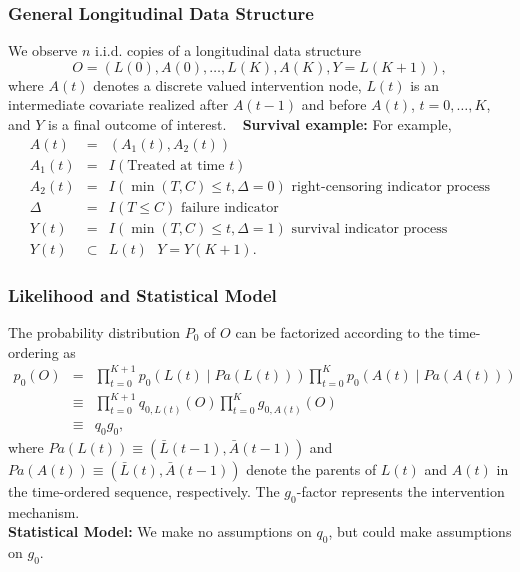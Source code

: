 \documentclass[t]{beamer}
\begin{document}
\begin{frame}
\frametitle{General Longitudinal Data Structure}
We observe $n$ i.i.d. copies of a longitudinal data structure
\[
O=(L(0),A(0),\ldots,L(K),A(K),Y=L(K+1)),\]
where $A(t)$ denotes a discrete valued intervention node,  $L(t)$ is an intermediate covariate realized after 
$A(t-1)$ and  before $A(t)$, $t=0,\ldots,K$, and $Y$ is a final outcome of interest.
\ \newline
{\bf Survival example:}
For example, 
\begin{eqnarray*}
A(t)&=&(A_1(t),A_2(t))\\
A_1(t)&=& I(\mbox{Treated at time $t$})\\
A_2(t)&=& I(\min(T,C)\leq t,\Delta=0)\mbox{ right-censoring indicator process}\\
\Delta&=&I(T\leq C)\mbox{ failure indicator}\\
Y(t)&=&I(\min(T,C)\leq t,\Delta=1)\mbox{ survival indicator process}\\
Y(t)&\subset& L(t)\mbox{ $Y=Y(K+1)$}.
\end{eqnarray*}
\end{frame}

\begin{frame}
\frametitle{Likelihood and Statistical Model}
The probability distribution $P_0$ of $O$ can be factorized according to the time-ordering as 
\begin{eqnarray*}
p_0(O)&=&\prod_{t=0}^{K+1} p_0(L(t)\mid Pa(L(t)) ) \prod_{t=0}^K p_0(A(t)\mid Pa(A(t)) )\\
&\equiv& \prod_{t=0}^{K+1}q_{0,L(t)}(O)\prod_{t=0}^K g_{0,A(t)}(O)\\
&\equiv& q_0g_0,
\end{eqnarray*}
where $Pa(L(t))\equiv (\bar{L}(t-1),\bar{A}(t-1))$ and $Pa(A(t))\equiv (\bar{L}(t),\bar{A}(t-1))$ denote the parents  of $L(t)$ and $A(t)$ in the time-ordered sequence, respectively. 
The $g_0$-factor represents the intervention mechanism.\\
{\bf Statistical Model:}
We make no assumptions on $q_0$, but could make assumptions on $g_0$.
\end{frame}
\end{document}
